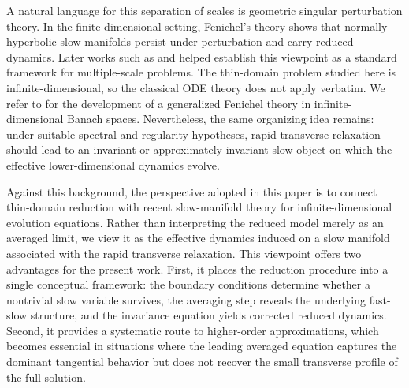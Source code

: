 \documentclass[11pt]{article}
\theoremstyle{definition}
\theoremstyle{remark}
\numberwithin{equation}{section}
\begin{document}
A natural language for this separation of scales is geometric singular perturbation theory.
In the finite-dimensional setting, Fenichel's theory \cite{fenichel1979geometric} shows that normally hyperbolic slow manifolds persist under perturbation and carry reduced dynamics.
Later works such as \cite{Jones1995} and \cite{kuehn2015multiple} helped establish this viewpoint as a standard framework for multiple-scale problems.
The thin-domain problem studied here is infinite-dimensional, so the classical ODE theory does not apply verbatim. We refer to \cite{hummel2022slow,kuehn2024infinite,kuehn2025fast,kuehn2026approximate} for the development of a generalized Fenichel theory in infinite-dimensional Banach spaces.
Nevertheless, the same organizing idea remains:
under suitable spectral and regularity hypotheses, rapid transverse relaxation should lead to an invariant or approximately invariant slow object on which the effective lower-dimensional dynamics evolve.

Against this background, the perspective adopted in this paper is to connect thin-domain reduction with recent slow-manifold theory for infinite-dimensional evolution equations.
Rather than interpreting the reduced model merely as an averaged limit, we view it as the effective dynamics induced on a slow manifold associated with the rapid transverse relaxation.
This viewpoint offers two advantages for the present work. 
First, it places the reduction procedure into a single conceptual framework: the boundary conditions determine whether a nontrivial slow variable survives, the averaging step reveals the underlying fast-slow structure, and the invariance equation yields corrected reduced dynamics. 
Second, it provides a systematic route to higher-order approximations, which becomes essential in situations where the leading averaged equation captures the dominant tangential behavior but does not recover the small transverse profile of the full solution.\\
\end{document}
